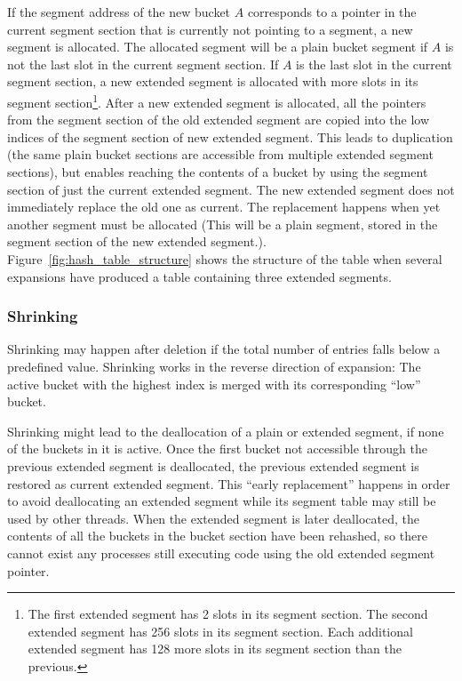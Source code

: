 \documentclass[aps,pre,preprint,nofootinbib]{revtex4}
\begin{document}
If the segment address of the new bucket $A$ corresponds to a pointer in the current segment section that is currently not pointing to a segment, a new segment is allocated.
The allocated segment will be a plain bucket segment if $A$ is not the last slot in the current segment section.
If $A$ is the last slot in the current segment section, a new extended segment is allocated with more slots in its segment section\footnote{
  The first extended segment has 2 slots in its segment section.
  The second extended segment has 256 slots in its segment section.
  Each additional extended segment has 128 more slots in its segment section than the previous.
}.
After a new extended segment is allocated, all the pointers from the segment section of the old extended segment are copied into the low indices of the segment section of new extended segment.
This leads to duplication (the same plain bucket sections are accessible from multiple extended segment sections), but enables reaching the contents of a bucket by using the segment section of just the current extended segment.
The new extended segment does not immediately replace the old one as current.
The replacement happens when yet another segment must be allocated
(This will be a plain segment, stored in the segment section of the new extended segment.).
Figure~\ref{fig:hash_table_structure} shows the structure of the table when several expansions have produced a table containing three extended segments. 

\subsubsection{Shrinking}

Shrinking may happen after deletion if the total number of entries falls below a predefined value.
Shrinking works in the reverse direction of expansion:
The active bucket with the highest index is merged with its corresponding ``low'' bucket.

Shrinking might lead to the deallocation of a plain or extended segment, if none of the buckets in it is active.
Once the first bucket not accessible through the previous extended segment is deallocated, the previous extended segment is restored as current extended segment.
This ``early replacement'' happens in order to avoid deallocating an extended segment while its segment table may still be used by other threads.
When the extended segment is later deallocated, the contents of all the buckets in the bucket section have been rehashed, so there cannot exist any processes still executing code using the old extended segment pointer.
\end{document}
